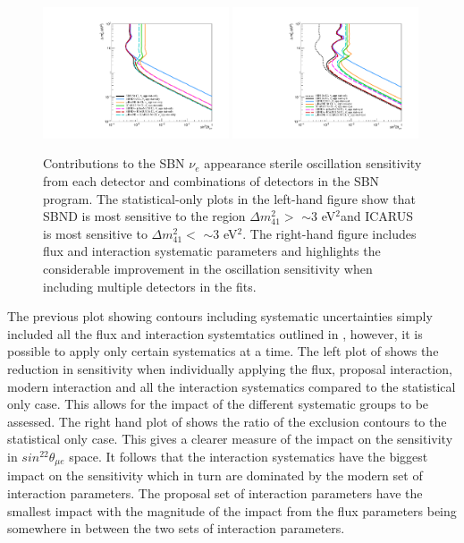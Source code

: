 \begin{figure}[h!]
    \centering
    \includegraphics[width = 0.49\textwidth]{figures-chap6/exclusion_contours/nue_app_detector_combinations_stat_only.pdf}
    \includegraphics[width = 0.49\textwidth]{figures-chap6/exclusion_contours/nue_app_detector_combinations_stat+syst.pdf}
    \caption[\nue appearance sensitivities from different detector combinations.]{Contributions to the SBN $\nu_e$ appearance sterile oscillation sensitivity from each detector and combinations of detectors in the SBN program. The statistical-only plots in the left-hand figure show that SBND is most sensitive to the region $\Delta m_{41}^{2} >$ $\sim$3 eV$^{2}$and ICARUS is most sensitive to $\Delta m_{41}^{2} <$ $\sim$3 eV$^{2}$. The right-hand figure includes flux and interaction systematic parameters and highlights the considerable improvement in the oscillation sensitivity when including multiple detectors in the fits.}
    \label{fig:nue_sensitivity_detector_contribution}
\end{figure}

The previous plot showing contours including systematic uncertainties simply included all the flux and interaction systemtatics outlined in , however, it is possible to apply only certain systematics at a time. The left plot of   shows the reduction in sensitivity when individually applying the flux, proposal interaction, modern interaction and all the interaction systematics compared to the statistical only case. This allows for the impact of the different systematic groups to be assessed. The right hand plot of  shows the ratio of the exclusion contours to the statistical only case. This gives a clearer measure of the impact on the sensitivity in $sin^22\theta_{\mu e}$ space. It follows that the interaction systematics have the biggest impact on the sensitivity which in turn are dominated by the modern set of interaction parameters. The proposal set of interaction parameters have the smallest impact with the magnitude of the impact from the flux parameters being somewhere in between the two sets of interaction parameters. 

